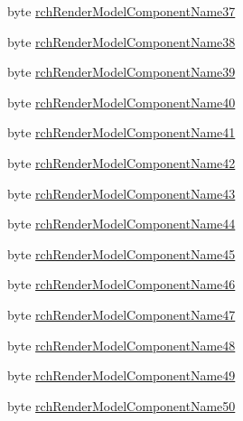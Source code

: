 \begin{DoxyCompactItemize}
\item 
byte \mbox{\hyperlink{struct_valve_1_1_v_r_1_1_input_origin_info__t_ae58fbb188ac2046a7fcabf1ab2bb5373}{rch\+Render\+Model\+Component\+Name37}}
\item 
byte \mbox{\hyperlink{struct_valve_1_1_v_r_1_1_input_origin_info__t_aa080f832a37305ea109503956e110575}{rch\+Render\+Model\+Component\+Name38}}
\item 
byte \mbox{\hyperlink{struct_valve_1_1_v_r_1_1_input_origin_info__t_a9752c0005b146fcc36302f979116b150}{rch\+Render\+Model\+Component\+Name39}}
\item 
byte \mbox{\hyperlink{struct_valve_1_1_v_r_1_1_input_origin_info__t_ad889e461e6d8ffd717e08952c44bce54}{rch\+Render\+Model\+Component\+Name40}}
\item 
byte \mbox{\hyperlink{struct_valve_1_1_v_r_1_1_input_origin_info__t_a367372cd0c9e9b2b51790f5f609b2611}{rch\+Render\+Model\+Component\+Name41}}
\item 
byte \mbox{\hyperlink{struct_valve_1_1_v_r_1_1_input_origin_info__t_a69a0f8b356c192ff6a825e74dd259515}{rch\+Render\+Model\+Component\+Name42}}
\item 
byte \mbox{\hyperlink{struct_valve_1_1_v_r_1_1_input_origin_info__t_aa5c28b5054ea82e90457cb2302711f72}{rch\+Render\+Model\+Component\+Name43}}
\item 
byte \mbox{\hyperlink{struct_valve_1_1_v_r_1_1_input_origin_info__t_a96924cbfa1b7b00c1677ec8d087e267c}{rch\+Render\+Model\+Component\+Name44}}
\item 
byte \mbox{\hyperlink{struct_valve_1_1_v_r_1_1_input_origin_info__t_a7bd6ac110588e8c38966f4ee307f134b}{rch\+Render\+Model\+Component\+Name45}}
\item 
byte \mbox{\hyperlink{struct_valve_1_1_v_r_1_1_input_origin_info__t_a87bdc58295fe396d9b15616dbf2b3805}{rch\+Render\+Model\+Component\+Name46}}
\item 
byte \mbox{\hyperlink{struct_valve_1_1_v_r_1_1_input_origin_info__t_a1cc983326017c93c5a2517f38ad88966}{rch\+Render\+Model\+Component\+Name47}}
\item 
byte \mbox{\hyperlink{struct_valve_1_1_v_r_1_1_input_origin_info__t_a27ccee42bb1c09a40330edda9787e538}{rch\+Render\+Model\+Component\+Name48}}
\item 
byte \mbox{\hyperlink{struct_valve_1_1_v_r_1_1_input_origin_info__t_a7f4c03e1fe5c4e1e36c88876db51d2fe}{rch\+Render\+Model\+Component\+Name49}}
\item 
byte \mbox{\hyperlink{struct_valve_1_1_v_r_1_1_input_origin_info__t_a905e8ceb11499fc54754ddd716359120}{rch\+Render\+Model\+Component\+Name50}}

\end{DoxyCompactItemize}
